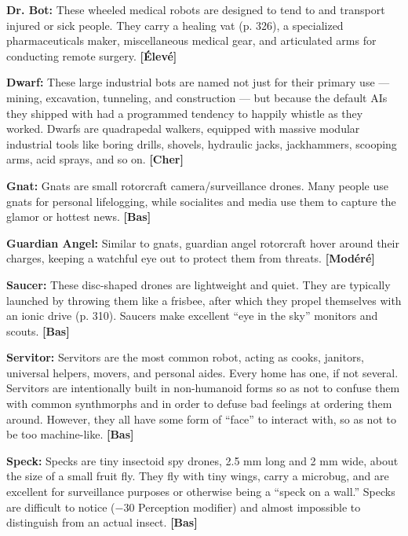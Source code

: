 {{\textbf{Dr. Bot:} These wheeled medical robots are designed to tend to and transport injured or sick people. They carry a healing vat (p. 326), a specialized pharmaceuticals maker, miscellaneous medical gear, and articulated arms for conducting remote surgery. \textbf{[Élevé]} 

\textbf{Dwarf:} These large industrial bots are named not just for their primary use --- mining, excavation, tunneling, and construction --- but because the default AIs they shipped with had a programmed tendency to happily whistle as they worked. Dwarfs are quadrapedal walkers, equipped with massive modular industrial tools like boring drills, shovels, hydraulic jacks, jackhammers, scooping arms, acid sprays, and so on. \textbf{[Cher]} 

\textbf{Gnat:} Gnats are small rotorcraft camera/surveillance drones. Many people use gnats for personal lifelogging, while socialites and media use them to capture the glamor or hottest news. \textbf{[Bas]} 

\textbf{Guardian Angel:} Similar to gnats, guardian angel rotorcraft hover around their charges, keeping a watchful eye out to protect them from threats. \textbf{[Modéré]} 

\textbf{Saucer:} These disc-shaped drones are lightweight and quiet. They are typically launched by throwing them like a frisbee, after which they propel themselves with an ionic drive (p. 310). Saucers make excellent ``eye in the sky'' monitors and scouts. \textbf{[Bas]} 

\textbf{Servitor:} Servitors are the most common robot, acting as cooks, janitors, universal helpers, movers, and personal aides. Every home has one, if not several. Servitors are intentionally built in non-humanoid forms so as not to confuse them with common synthmorphs and in order to defuse bad feelings at ordering them around. However, they all have some form of ``face'' to interact with, so as not to be too machine-like. \textbf{[Bas]} 

\textbf{Speck:} Specks are tiny insectoid spy drones, 2.5 mm long and 2 mm wide, about the size of a small fruit fly. They fly with tiny wings, carry a microbug, and are excellent for surveillance purposes or otherwise being a ``speck on a wall.'' Specks are difficult to notice ($-$30 Perception modifier) and almost impossible to distinguish from an actual insect. \textbf{[Bas]} 

\begin{table} \begin{tabular}{|l|l|l|l|l|l|l|} \hline


\end{tabular}
\end{table}}}
